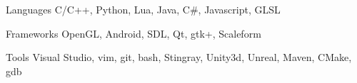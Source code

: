 


\begin{cvskills}


\cvskill
{Languages} %
{C/C++, Python, Lua, Java, C\#, Javascript, GLSL } %

\cvskill
{Frameworks}
{OpenGL, Android, SDL, Qt, gtk+, Scaleform}

\cvskill
{Tools}
{Visual Studio, vim, git, bash, Stingray, Unity3d, Unreal, Maven, CMake, gdb}



\end{cvskills}
